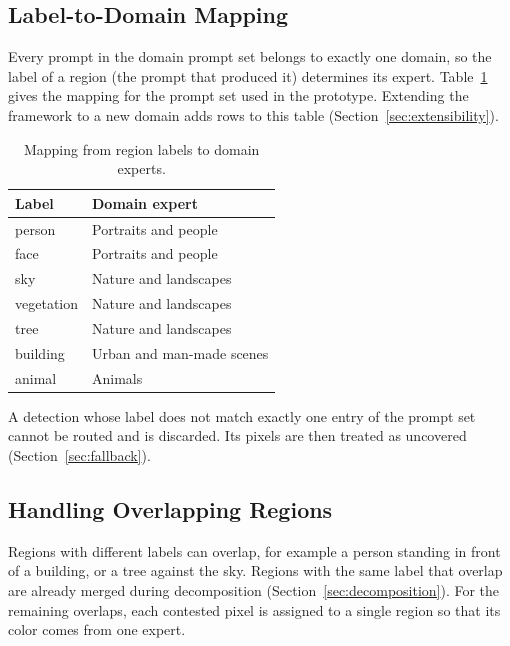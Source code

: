 \documentclass{FastFyp}
\begin{document}
\subsection{Label-to-Domain Mapping}

Every prompt in the domain prompt set belongs to exactly one domain, so the label of a region (the prompt that produced it) determines its expert. Table~\ref{tab:routing} gives the mapping for the prompt set used in the prototype. Extending the framework to a new domain adds rows to this table (Section~\ref{sec:extensibility}).

\begin{table}[htbp]
    \centering
    \renewcommand{\arraystretch}{1.3}
    \caption{Mapping from region labels to domain experts.}
    \label{tab:routing}
    \begin{tabular}{|p{3.5cm}|p{6cm}|}
        \hline
        \textbf{Label} & \textbf{Domain expert} \\
        \hline
        person & Portraits and people \\
        \hline
        face & Portraits and people \\
        \hline
        sky & Nature and landscapes \\
        \hline
        vegetation & Nature and landscapes \\
        \hline
        tree & Nature and landscapes \\
        \hline
        building & Urban and man-made scenes \\
        \hline
        animal & Animals \\
        \hline
    \end{tabular}
\end{table}

A detection whose label does not match exactly one entry of the prompt set cannot be routed and is discarded. Its pixels are then treated as uncovered (Section~\ref{sec:fallback}).

\subsection{Handling Overlapping Regions}
\label{sec:overlap}

Regions with different labels can overlap, for example a person standing in front of a building, or a tree against the sky. Regions with the same label that overlap are already merged during decomposition (Section~\ref{sec:decomposition}). For the remaining overlaps, each contested pixel is assigned to a single region so that its color comes from one expert.
\end{document}
